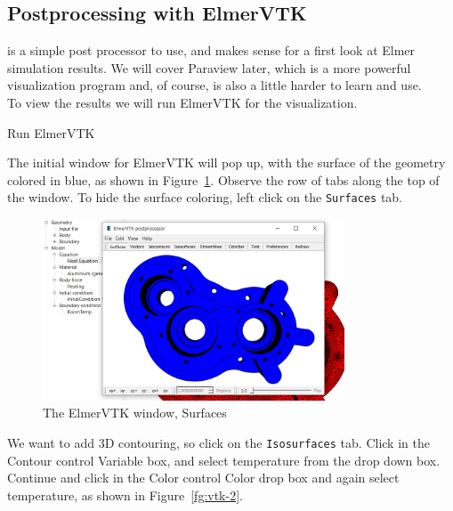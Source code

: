 \subsection*{Postprocessing with ElmerVTK}

 is a simple post processor to use, and makes sense for a first look at Elmer simulation results.  We will cover Paraview later, which is a more powerful visualization program and, of course, is also a little harder to learn and use.\\

To view the results we will run ElmerVTK for the visualization.

\ttbegin
Run
  ElmerVTK
\ttend

\newpage
The initial window for ElmerVTK will pop up, with the surface of the geometry colored in blue, as shown in Figure~\ref{fg:vtk-1}.  Observe the row of tabs along the top of the window.  To hide the surface coloring, left click on the \texttt{Surfaces} tab.

\begin{figure}[H]
\begin{center}
\includegraphics[width=0.8\textwidth]{vtk-1}
\caption{The ElmerVTK window, Surfaces}\label{fg:vtk-1}
\end{center}
\end{figure}

We want to add 3D contouring, so click on the \texttt{Isosurfaces} tab.  Click in the Contour control Variable box, and select temperature from the drop down box.  Continue and click in the Color control Color drop box and again select temperature, as shown in Figure~\ref{fg:vtk-2}.

